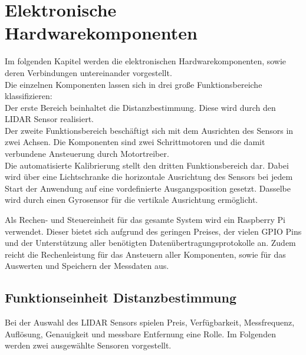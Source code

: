 
\chapter{Elektronische Hardwarekomponenten}\label{chap:hardware}
Im folgenden Kapitel werden die elektronischen Hardwarekomponenten, sowie deren Verbindungen untereinander vorgestellt. \\
Die einzelnen Komponenten lassen sich in drei große Funktionsbereiche klassifizieren:\\
Der erste Bereich beinhaltet die Distanzbestimmung. Diese wird durch den \ac{LIDAR} Sensor realisiert.\\
Der zweite Funktionsbereich beschäftigt sich mit dem Ausrichten des Sensors in zwei Achsen. Die Komponenten sind zwei Schrittmotoren und die damit verbundene Ansteuerung durch Motortreiber. \\
Die automatisierte Kalibrierung stellt den dritten Funktionsbereich dar. Dabei wird über eine Lichtschranke die horizontale Ausrichtung des Sensors bei jedem Start der Anwendung auf eine vordefinierte Ausgangsposition gesetzt. Dasselbe wird durch einen Gyrosensor für die vertikale Ausrichtung ermöglicht.

Als Rechen- und Steuereinheit für das gesamte System wird ein Raspberry Pi verwendet. Dieser bietet sich aufgrund des geringen Preises, der vielen \ac{GPIO} Pins und der Unterstützung aller benötigten Datenübertragungsprotokolle an. Zudem reicht die Rechenleistung für das Ansteuern aller Komponenten, sowie für das Auswerten und Speichern der Messdaten aus.
\section{Funktionseinheit Distanzbestimmung}
Bei der Auswahl des \ac{LIDAR} Sensors spielen Preis, Verfügbarkeit, Messfrequenz, Auflösung, Genauigkeit und messbare Entfernung eine Rolle. Im Folgenden werden zwei ausgewählte Sensoren vorgestellt. 
\newpage
